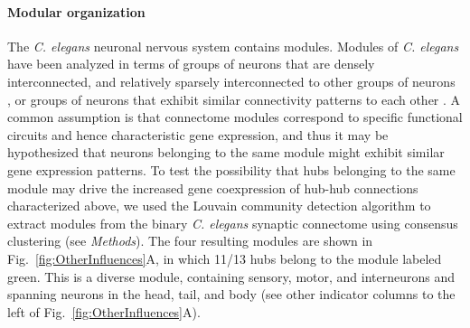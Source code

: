 \documentclass[10pt,letterpaper]{article}
\begin{document}
\paragraph{Modular organization}
The \emph{C. elegans} neuronal nervous system contains modules.
Modules of \emph{C. elegans} have been analyzed in terms of groups of neurons that are densely interconnected, and relatively sparsely interconnected to other groups of neurons \cite{Kim2014, Bassett2010}, or groups of neurons that exhibit similar connectivity patterns to each other \cite{Achacoso:1992ay, Pavlovic2014}.
A common assumption is that connectome modules correspond to specific functional circuits and hence characteristic gene expression, and thus it may be hypothesized that neurons belonging to the same module might exhibit similar gene expression patterns.
To test the possibility that hubs belonging to the same module may drive the increased gene coexpression of hub-hub connections characterized above, we used the Louvain community detection algorithm \cite{Blondel:2008do} to extract modules from the binary \emph{C. elegans} synaptic connectome using consensus clustering (see \textit{Methods}).
The four resulting modules are shown in Fig.~\ref{fig:OtherInfluences}A, in which 11/13 hubs belong to the module labeled green.
This is a diverse module, containing sensory, motor, and interneurons and spanning neurons in the head, tail, and body (see other indicator columns to the left of Fig.~\ref{fig:OtherInfluences}A).
\end{document}
